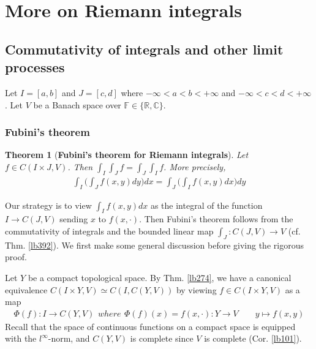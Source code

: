 \documentclass[12pt,b5paper,notitlepage]{article}
\theoremstyle{definition}
\theoremstyle{plain}
\newtheorem{thm}[df]{Theorem}
\newcommand{\Cbb}{\mathbb C}
\newcommand{\Rbb}{\mathbb R}
\newcommand{\Fbb}{\mathbb F}
\numberwithin{equation}{section}
\begin{document}
\newpage




\section{More on Riemann integrals}


\subsection{Commutativity of integrals and other limit processes}\label{lb419}


Let $I=[a,b]$ and $J=[c,d]$ where $-\infty<a<b<+\infty$ and $-\infty<c<d<+\infty$. Let $V$ be a Banach space over $\Fbb\in\{\Rbb,\Cbb\}$.


\subsubsection{Fubini's theorem}


\begin{thm}[\textbf{Fubini's theorem for Riemann integrals}] \label{lb399} 
Let $f\in C(I\times J,V)$. Then $\int_I\int_Jf=\int_J\int_If$. More precisely,
\begin{align}
\int_I\Big(\int_Jf(x,y)dy\Big)dx=\int_J\Big(\int_I f(x,y)dx\Big)dy
\end{align}
\end{thm}

Our strategy is to view $\int_I f(x,y)dx$ as the integral of the function $I\rightarrow C(J,V)$ sending $x$ to $f(x,\cdot)$. Then Fubini's theorem follows from the commutativity of integrals and the bounded linear map $\int_J:C(J,V)\rightarrow V$ (cf. Thm. \ref{lb392}). We first make some general discussion before giving the rigorous proof.


Let $Y$ be a compact topological space. By Thm. \ref{lb274}, we have a canonical equivalence $C(I\times Y,V)\simeq C(I,C(Y,V))$ by viewing $f\in C(I\times Y,V)$ as a map
\begin{subequations}\label{eq167}
\begin{align}
\Phi(f):I\rightarrow C(Y,V)
\end{align}
where
\begin{align}
\Phi(f)(x)=f(x,\cdot):Y\rightarrow V\qquad y\mapsto f(x,y)
\end{align}
\end{subequations}
Recall that the space of continuous functions on a compact space is equipped with the $l^\infty$-norm, and $C(Y,V)$ is complete since $V$ is complete (Cor. \ref{lb101}).
\end{document}

